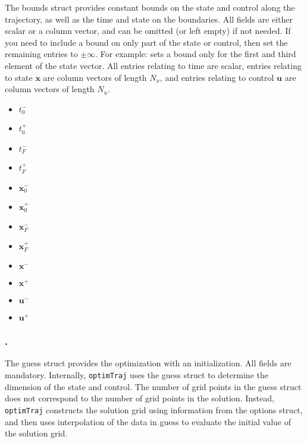 The bounds struct provides constant bounds on the state and control along the trajectory, as well as the time and state on the boundaries. All fields are either scalar or a column vector, and can be omitted (or left empty) if not needed. If you need to include a bound on only part of the state or control, then set the remaining entries to $\pm\infty$. For example:  sets a bound only for the first and third element of the state vector. All entries relating to time are scalar, entries relating to state $\bm{x}$ are column vectors of length $N_x$, and entries relating to control $\bm{u}$ are column vectors of length $N_u$.
\begin{itemize} \setlength\itemsep{-0.1em}
\item {}\tc{ = }$t_0^-$ 
\item {}\tc{ = }$t_0^+$ 
\item {}\tc{ = }$t_F^-$ 
\item {}\tc{ = }$t_F^+$ 
\item {}\tc{ = }$\bm{x}_0^-$ 
\item {}\tc{ = }$\bm{x}_0^+$ 
\item {}\tc{ = }$\bm{x}_F^-$ 
\item {}\tc{ = }$\bm{x}_F^+$ 
\item {}\tc{ = }$\bm{x}^-$ 
\item {}\tc{ = }$\bm{x}^+$ 
\item {}\tc{ = }$\bm{u}^-$ 
\item {}\tc{ = }$\bm{u}^+$ 
\end{itemize}
 

\subsubsection*{.}

The guess struct provides the optimization with an initialization. All fields are mandatory. Internally, \texttt{optimTraj} uses the guess struct to determine the dimension of the state and control. The number of grid points in the guess struct does not correspond to the number of grid points in the solution. Instead, \texttt{optimTraj} constructs the solution grid using information from the options struct, and then uses interpolation of the data in guess to evaluate the initial value of the solution grid.

